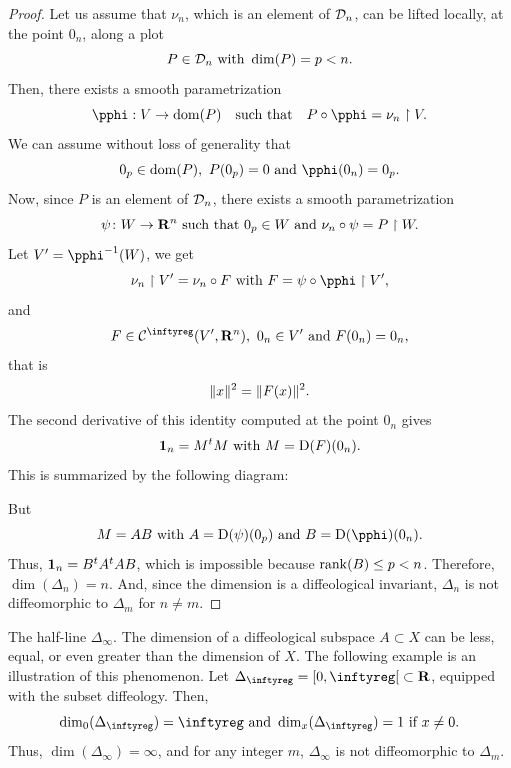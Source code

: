 \begin{proof}
  Let us assume that $\nu_n$,
  which is an element of $\mathcal{D}_n$,
  can be lifted locally,
  at the point $0_n$,
  along a plot
  $$%
    P \in \cD_n \SpacedText{with} \dim(P) = p < n.
    $$%
  Then,
  there
  exists a smooth parametrization
  $$%
    \pphi : V \to \Domain(P)
    \quad \text{such that} \quad
    P \circ \pphi = \nu_n \restriction V.
    $$%
  We can assume without loss of generality that
  $$%
    0_p \in \Domain(P), \ P(0_p) = 0 \SpacedText{and} \pphi(0_n) = 0_p.
    $$%
  Now,
  since $P$ is an element of $\mathcal{D}_n$,
  there exists a smooth parametrization
  $$%
    \psi \colon W \to \RR^n \SpacedText{such that} 0_p \in W \SpacedText{and} \nu_n \circ \psi = P \restriction W.
    $$%
  Let $V' = \pphi^{-1}(W)$,
  we get
  $$%
    \nu_n \restriction V' = \nu_n \circ F \SpacedText{with} F = \psi \circ \pphi \restriction V',
    $$%
  and
  $$%
    F \in \Cinfty(V', \RR^n), \ 0_n \in V' \SpacedText{and} F(0_n) = 0_n,
    $$%
  that is
  $$%
    \Norm{x}^2 = \Norm{F(x)}^2.
    $$%
  The second derivative of this
  identity computed at the point $0_n$ gives
  $$%
    \Id_n = M^t M \SpacedText{with} M = \Der(F)(0_n).
    $$%
  This is summarized by the following diagram:
  \begin{center}
  \end{center}
  But
  $$%
    M = A B \SpacedText{with} A = \Der(\psi)(0_p) \SpacedText{and} B = \Der(\pphi)(0_n).
    $$%
  Thus,
  ${\mathbf{1}}_n = B^tA^t A B$,
  which is impossible because $\operatorname{rank}( B) \leq p < n$.
  Therefore,
  $\dim(\Delta_n) = n$.
  And,
  since the dimension is a diffeological invariant,
  $\Delta_n$ is not diffeomorphic to $\Delta_m$ for $n \neq m$.
\end{proof}

\begin{Article}{The half-line $\Delta_\infty$.}{}
  \label{Dimension-of-the-half-line}
  The dimension of a diffeological subspace $A \subset X$ can be less,
  equal,
  or even greater than the dimension of $X$.
  The following example is an illustration of this phenomenon.
  Let $\Delta_\infty = \LeftClosedInterval{0,\infty} \subset \RR$,
  equipped with the subset diffeology.
  Then,
  $$%
    \dim_0(\Delta_\infty) = \infty \SpacedText{and} \dim_x(\Delta_\infty) = 1 \SpacedText{if} x \neq 0.
    $$%
  Thus,
  $\dim(\Delta_\infty) = \infty$,
  and for any integer $m$,
  $\Delta_\infty$ is not diffeomorphic to $\Delta_m$.
\end{Article}


